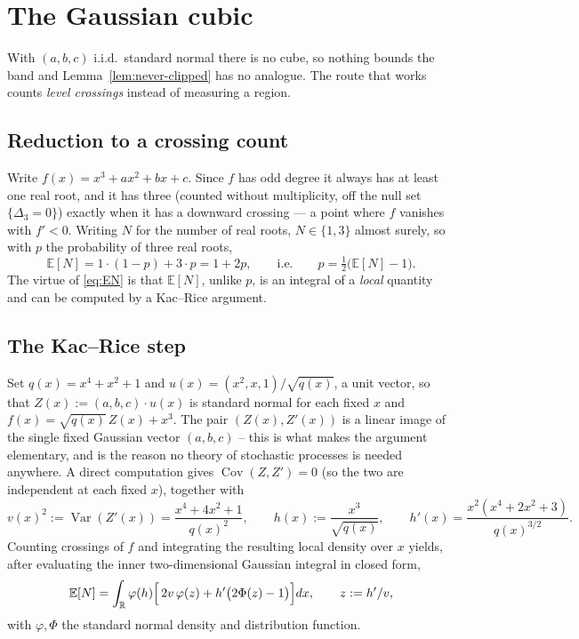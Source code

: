 \documentclass[11pt,reqno]{amsart}
\theoremstyle{plain}
\theoremstyle{remark}
\newcommand{\RR}{\mathbb{R}}
\newcommand{\disc}{\Delta}
\begin{document}
\section{The Gaussian cubic} \label{sec:gaussian}

With $(a,b,c)$ i.i.d.\ standard normal there is no cube, so nothing bounds
the band and Lemma~\ref{lem:never-clipped} has no analogue. The route that
works counts \emph{level crossings} instead of measuring a region.

\subsection{Reduction to a crossing count}
Write $f(x)=x^3+ax^2+bx+c$. Since $f$ has odd degree it always has at least
one real root, and it has three (counted without multiplicity, off the null
set $\{\disc_3=0\}$) exactly when it has a downward crossing --- a point
where $f$ vanishes with $f'<0$. Writing $N$ for the number of real roots,
$N\in\{1,3\}$ almost surely, so with $p$ the probability of three real roots,
\begin{equation} \label{eq:EN}
  \mathbb{E}[N] = 1\cdot(1-p) + 3\cdot p = 1+2p,
  \qquad\text{i.e.}\qquad p = \tfrac12\bigl(\mathbb{E}[N]-1\bigr).
\end{equation}
The virtue of \eqref{eq:EN} is that $\mathbb{E}[N]$, unlike $p$, is an
integral of a \emph{local} quantity and can be computed by a Kac--Rice
argument.

\subsection{The Kac--Rice step}
Set $q(x)=x^4+x^2+1$ and $u(x)=(x^2,x,1)/\sqrt{q(x)}$, a unit vector, so that
$Z(x):=(a,b,c)\cdot u(x)$ is standard normal for each fixed $x$ and
$f(x)=\sqrt{q(x)}\,Z(x)+x^3$. The pair $(Z(x),Z'(x))$ is a linear image of
the single fixed Gaussian vector $(a,b,c)$ -- this is what makes the argument
elementary, and is the reason no theory of stochastic processes is needed
anywhere. A direct computation gives $\operatorname{Cov}(Z,Z')=0$ (so the two
are independent at each fixed $x$), together with
\[
  v(x)^2 := \operatorname{Var}(Z'(x)) = \frac{x^4+4x^2+1}{q(x)^2},
  \qquad h(x) := \frac{x^3}{\sqrt{q(x)}},
  \qquad h'(x) = \frac{x^2(x^4+2x^2+3)}{q(x)^{3/2}} .
\]
Counting crossings of $f$ and integrating the resulting local density over
$x$ yields, after evaluating the inner two-dimensional Gaussian integral in
closed form,
\begin{equation} \label{eq:kacrice}
  \mathbb{E}[N] = \int_{\RR} \varphi(h)\Bigl[\,2v\,\varphi(z) + h'\bigl(2\Phi(z)-1\bigr)\Bigr]dx,
  \qquad z:=h'/v,
\end{equation}
with $\varphi,\Phi$ the standard normal density and distribution function.
\end{document}
